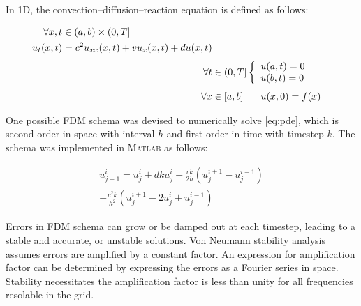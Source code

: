 \documentclass[a4paper,12pt,twocolumn]{article}
\begin{document}
In 1D, the convection--diffusion--reaction equation is defined as follows:
\begin{footnotesize}
    \vspace{-0.5\baselineskip}
    \begin{align}
        \label{eq:pde}
        \begin{split}
            \forall x,t &\in (a, b) \times (0, T] \\
            u_{t}(x,t) &= c^2u_{xx}(x,t) + vu_x(x,t) + du(x,t)
        \end{split} \\[0.2\baselineskip]
        \nonumber
        \forall t &\in (0, T] \left\{
        \begin{array}{l}
            u(a,t) = 0 \\
            u(b,t) = 0
        \end{array}
        \right.\\[0.2\baselineskip]
        \nonumber
        \forall x &\in [a, b]\hspace{1.8em}u(x,0) = f(x)
    \end{align}
    \vspace{-1.5\baselineskip}
\end{footnotesize}

One possible FDM schema was devised to numerically solve \eqref{eq:pde}, which
is second order in space with interval $h$ and first order in time with timestep
$k$. The schema was implemented in \textsc{Matlab} as follows:
\begin{footnotesize}
    \vspace{-0.5\baselineskip}
    \begin{multline} \label{eq:schema}
        u^i_{j+1} = u^i_j + dku^i_j + \frac{vk}{2h}(u^{i+1}_j - u^{i-1}_j) \\
            + \frac{c^2k}{h^2}(u^{i+1}_j - 2u^i_j + u^{i-1}_j)
    \end{multline}
    \vspace{-1.5\baselineskip}
\end{footnotesize}

Errors in FDM schema can grow or be damped out at each timestep, leading to a
stable and accurate, or unstable solutions. Von Neumann stability analysis 
assumes errors are amplified by a constant factor. An expression for
amplification factor can be determined by expressing the errors as a Fourier 
series in space. Stability necessitates the amplification factor is less than 
unity for all frequencies resolable in the grid.
\end{document}
